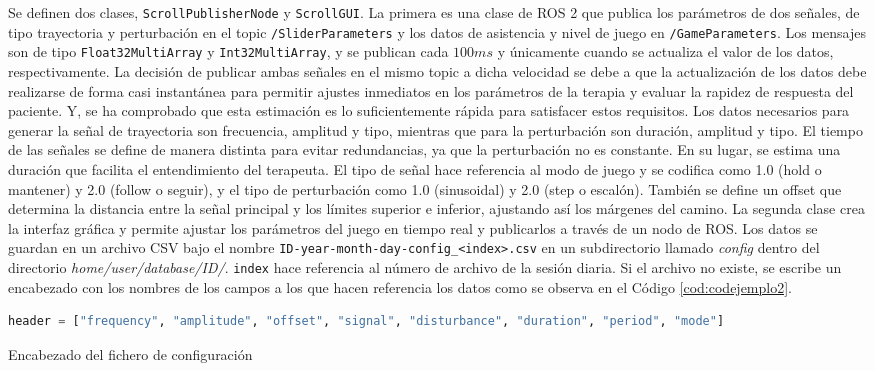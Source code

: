 Se definen dos clases, \verb|ScrollPublisherNode| y \verb|ScrollGUI|.
La primera es una clase de ROS 2 que publica los parámetros de dos señales, de tipo trayectoria y perturbación en el topic \verb|/SliderParameters| y los datos de asistencia y nivel de juego en \verb|/GameParameters|.
Los mensajes son de tipo \verb|Float32MultiArray| y \verb|Int32MultiArray|, y se publican cada $100 ms$ y únicamente cuando se actualiza el valor de los datos, respectivamente.
La decisión de publicar ambas señales en el mismo topic a dicha velocidad se debe a que la actualización de los datos debe realizarse de forma casi instantánea para permitir ajustes inmediatos en los parámetros de la terapia y evaluar la rapidez de respuesta del paciente.
Y, se ha comprobado que esta estimación es lo suficientemente rápida para satisfacer estos requisitos.
Los datos necesarios para generar la señal de trayectoria son frecuencia, amplitud y tipo, mientras que para la perturbación son duración, amplitud y tipo.
El tiempo de las señales se define de manera distinta para evitar redundancias, ya que la perturbación no es constante.
En su lugar, se estima una duración que facilita el entendimiento del terapeuta.
El tipo de señal hace referencia al modo de juego y se codifica como 1.0 (hold o mantener) y 2.0 (follow o seguir), y el tipo de perturbación como 1.0 (sinusoidal) y 2.0 (step o escalón).
También se define un offset que determina la distancia entre la señal principal y los límites superior e inferior, ajustando así los márgenes del camino.
La segunda clase crea la interfaz gráfica y permite ajustar los parámetros del juego en tiempo real y publicarlos a través de un nodo de ROS.
Los datos se guardan en un archivo CSV bajo el nombre \verb|ID-year-month-day-config_<index>.csv| en un subdirectorio llamado \textit{config} dentro del directorio \textit{home/user/database/ID/}.
\verb|index| hace referencia al número de archivo de la sesión diaria.
Si el archivo no existe, se escribe un encabezado con los nombres de los campos a los que hacen referencia los datos como se observa en el Código \ref{cod:codejemplo2}.

\begin{code}[h]
\begin{lstlisting}[language=Python]
header = ["frequency", "amplitude", "offset", "signal", "disturbance", "duration", "period", "mode"]
\end{lstlisting}
\caption[Encabezado del fichero de configuración]{Encabezado del fichero de configuración}
\label{cod:codejemplo2}
\end{code}

